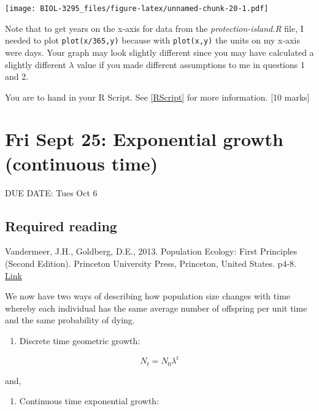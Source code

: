 \documentclass[]{book}
\providecommand{\tightlist}{%
  \setlength{\itemsep}{0pt}\setlength{\parskip}{0pt}}
\begin{document}
\texttt{[image: BIOL-3295\_files/figure-latex/unnamed-chunk-20-1.pdf]}

Note that to get years on the x-axis for data from the
\emph{protection-island.R} file, I needed to plot \texttt{plot(x/365,y)}
because with \texttt{plot(x,y)} the units on my x-axis were days. Your
graph may look slightly different since you may have calculated a
slightly different \(\lambda\) value if you made different assumptions
to me in questions 1 and 2.

You are to hand in your R Script. See \ref{RScript} for more
information. {[}10 marks{]}

\chapter{Fri Sept 25: Exponential growth (continuous
time)}\label{fri-sept-25-exponential-growth-continuous-time}

DUE DATE: Tues Oct 6

\section{Required reading}\label{required-reading}

Vandermeer, J.H., Goldberg, D.E., 2013. Population Ecology: First
Principles (Second Edition). Princeton University Press, Princeton,
United States. p4-8.
\href{https://ebookcentral-proquest-com.qe2a-proxy.mun.ca/lib/mun/detail.action?docID=1205619}{Link}

We now have two ways of describing how population size changes with time
whereby each individual has the same average number of offspring per
unit time and the same probability of dying.

\begin{enumerate}
\def\labelenumi{\arabic{enumi})}
\tightlist
\item
  Discrete time geometric growth:
\end{enumerate}

\begin{equation}
N_t = N_0\lambda^t
\label{eq:Geo}
\end{equation}

and,

\begin{enumerate}
\def\labelenumi{\arabic{enumi})}
\setcounter{enumi}{1}
\tightlist
\item
  Continuous time exponential growth:
\end{enumerate}
\end{document}
